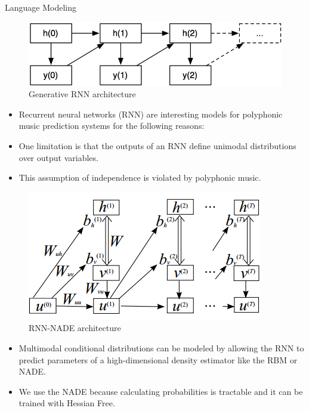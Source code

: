 \documentclass[final]{beamer}
\newlength{\onecolwid}
\begin{document}
\begin{frame}[t]
\begin{columns}[t]
\begin{column}{\onecolwid}
\begin{block}{Language Modeling}

\begin{figure}
\includegraphics[width=0.8\linewidth]{RNN.png}
\caption{Generative RNN architecture}
\end{figure}
\begin{itemize}
\item Recurrent neural networks (RNN) are interesting models for polyphonic music prediction systems for the following reasons:
\item One limitation is that the outputs of an RNN define unimodal distributions over output variables. 
\item This assumption of independence is violated by polyphonic music. 
\end{itemize}
\begin{figure}
\includegraphics[width=0.8\linewidth]{rnnrbm.png}
\caption{RNN-NADE architecture}
\end{figure}
\begin{itemize}
\item Multimodal conditional distributions can be modeled by allowing the RNN to predict parameters of a high-dimensional density estimator like the RBM or NADE. 
\item We use the NADE because calculating probabilities is tractable and it can be trained with Hessian Free. 
\end{itemize}
\end{block}



\end{column}
\end{columns}
\end{frame}
\end{document}
